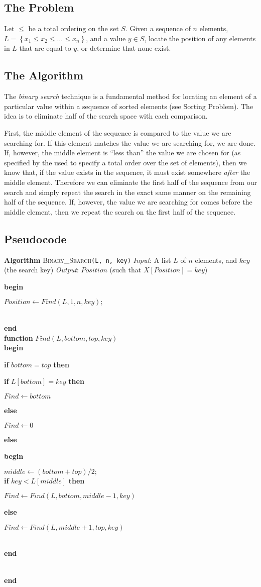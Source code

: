 \documentclass[12pt]{article}
\newcommand{\Lindent}{0.4in}
\newenvironment{Lalgorithm}[4]{
    \textbf{Algorithm} \textsc{#1}\texttt{(#2)}\newline
    \textit{Input}: #3\newline
    \textit{Output}: #4

}{}
\newcommand{\Lgroup}[1]{\textbf{begin}\\\hspace*{\Lindent}\parbox{\textwidth}{#1}\\\textbf{end}}
\newcommand{\Lif}[2]{\textbf{if} #1 \textbf{then}\\\hspace*{\Lindent}\parbox{\textwidth}{#2}}
\newcommand{\Lelse}[1]{\textbf{else}\\\hspace*{\Lindent}\parbox{\textwidth}{#1}}
\begin{document}

\subsection*{The Problem}

Let $\leq$ be a total ordering on the set $S$.  Given a sequence of $n$ elements,
$L = \left\{ x_1 \leq x_2 \leq \dots \leq x_n \right\}$, and a value $y \in S$,
locate the position of any elements in $L$ that are equal to $y$, or determine that
none exist.

\subsection*{The Algorithm}

The \emph{binary search} technique is a fundamental method for locating an element of
a particular value within a sequence of sorted elements (see Sorting Problem).
The idea is to eliminate half of the search space with each comparison.

First, the
middle element of the sequence is compared to the value we are searching for.  If this
element matches the value we are searching for, we are done.  If, however, the middle
element is ``less than'' the value we are chosen for (as specified by the  used
to specify a total order over the set of elements), then we know that, if the value exists
in the sequence, it must exist somewhere \emph{after} the middle element.  Therefore we
can eliminate the first half of the sequence from our search and simply repeat the search
in the exact same manner on the remaining half of the sequence.  If, however, the value we
are searching for comes before the middle element, then we repeat the search on the first half
of the sequence.

\subsection*{Pseudocode}

\begin{Lalgorithm}{Binary\_Search}{L, n, key}{A list $L$ of $n$ elements, and $key$ (the search key)}{$Position$ (such that $X[Position] = key$)}
\Lgroup{
    $Position \gets Find(L, 1, n, key);$
}\\
\textbf{function} $Find(L, bottom, top, key)$ \\
\Lgroup{
    \Lif{$bottom = top$}{
        \Lif{$L[bottom] = key$}{$Find \gets bottom$}
        \Lelse{$Find \gets 0$}}
    \Lelse{
    \Lgroup{
        $middle \gets (bottom + top) / 2;$ \\
        \Lif{$key < L[middle]$}{
            $Find \gets Find(L, bottom, middle - 1, key)$}
        \Lelse{
            $Find \gets Find(L, middle + 1, top, key)$}
    }}
}
\end{Lalgorithm}
\end{document}

